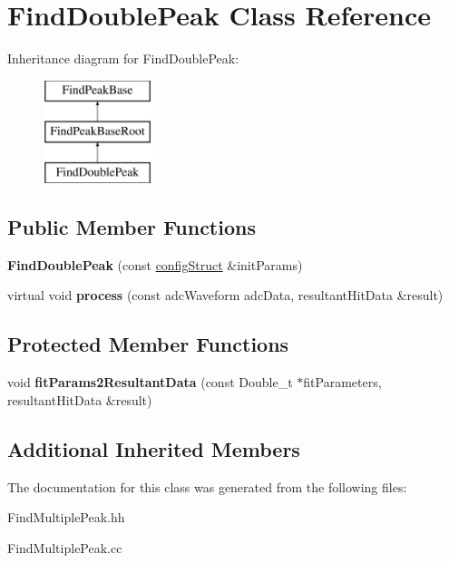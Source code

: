 \hypertarget{class_find_double_peak}{}\section{Find\+Double\+Peak Class Reference}
\label{class_find_double_peak}
Inheritance diagram for Find\+Double\+Peak\+:\begin{figure}[H]
\begin{center}
\leavevmode
\includegraphics[height=3.000000cm]{class_find_double_peak}
\end{center}
\end{figure}
\subsection*{Public Member Functions}
\begin{DoxyCompactItemize}
\item 
\hypertarget{class_find_double_peak_a3e553252c23fe24121eb352db128ea2b}{}{\bfseries Find\+Double\+Peak} (const \hyperlink{structconfig_struct}{config\+Struct} \&init\+Params)\label{class_find_double_peak_a3e553252c23fe24121eb352db128ea2b}

\item 
\hypertarget{class_find_double_peak_a4ab15919d094e8aff35ffbda61d8d145}{}virtual void {\bfseries process} (const adc\+Waveform adc\+Data, resultant\+Hit\+Data \&result)\label{class_find_double_peak_a4ab15919d094e8aff35ffbda61d8d145}

\end{DoxyCompactItemize}
\subsection*{Protected Member Functions}
\begin{DoxyCompactItemize}
\item 
\hypertarget{class_find_double_peak_ab477eb13e047e74d8a491670da899122}{}void {\bfseries fit\+Params2\+Resultant\+Data} (const Double\+\_\+t $\ast$fit\+Parameters, resultant\+Hit\+Data \&result)\label{class_find_double_peak_ab477eb13e047e74d8a491670da899122}

\end{DoxyCompactItemize}
\subsection*{Additional Inherited Members}


The documentation for this class was generated from the following files\+:\begin{DoxyCompactItemize}
\item 
Find\+Multiple\+Peak.\+hh\item 
Find\+Multiple\+Peak.\+cc\end{DoxyCompactItemize}
